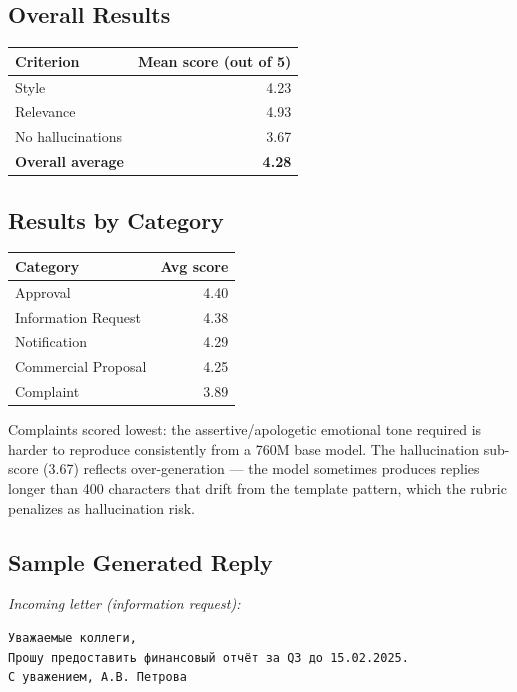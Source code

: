 \documentclass[12pt,a4paper]{article}
\begin{document}
\subsection{Overall Results}

\begin{center}
\begin{tabular}{lr}
\toprule
Criterion & Mean score (out of 5) \\
\midrule
Style & 4.23 \\
Relevance & 4.93 \\
No hallucinations & 3.67 \\
\midrule
\textbf{Overall average} & \textbf{4.28} \\
\bottomrule
\end{tabular}
\end{center}

\subsection{Results by Category}

\begin{center}
\begin{tabular}{lr}
\toprule
Category & Avg score \\
\midrule
Approval & 4.40 \\
Information Request & 4.38 \\
Notification & 4.29 \\
Commercial Proposal & 4.25 \\
Complaint & 3.89 \\
\bottomrule
\end{tabular}
\end{center}

Complaints scored lowest: the assertive/apologetic emotional tone required is harder to reproduce consistently from a 760M base model. The hallucination sub-score (3.67) reflects over-generation --- the model sometimes produces replies longer than 400 characters that drift from the template pattern, which the rubric penalizes as hallucination risk.

\subsection{Sample Generated Reply}

\textit{Incoming letter (information request):}
\begin{lstlisting}
Уважаемые коллеги,
Прошу предоставить финансовый отчёт за Q3 до 15.02.2025.
С уважением, А.В. Петрова
\end{lstlisting}
\end{document}
